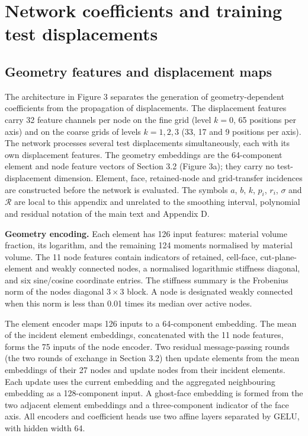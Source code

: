 \documentclass[preprint,12pt,authoryear]{elsarticle}
\begin{document}
\section{Network coefficients and training test displacements}

\subsection{Geometry features and displacement maps}

The architecture in Figure 3 separates the generation of geometry-dependent coefficients from the propagation of displacements. The displacement features carry 32 feature channels per node on the fine grid (level \(k=0\), 65 positions per axis) and on the coarse grids of levels \(k=1,2,3\) (33, 17 and 9 positions per axis). The network processes several test displacements simultaneously, each with its own displacement features. The geometry embeddings are the 64-component element and node feature vectors of Section 3.2 (Figure 3a); they carry no test-displacement dimension. Element, face, retained-node and grid-transfer incidences are constructed before the network is evaluated. The symbols \(a\), \(b\), \(k\), \(p_i\), \(r_i\), \(\sigma\) and \(\mathcal R\) are local to this appendix and unrelated to the smoothing interval, polynomial and residual notation of the main text and Appendix D.

\textbf{Geometry encoding.} Each element has 126 input features: material volume fraction, its logarithm, and the remaining 124 moments normalised by material volume. The 11 node features contain indicators of retained, cell-face, cut-plane-element and weakly connected nodes, a normalised logarithmic stiffness diagonal, and six sine/cosine coordinate entries. The stiffness summary is the Frobenius norm of the node\textquotesingle s diagonal \(3\times3\) block. A node is designated weakly connected when this norm is less than 0.01 times its median over active nodes.

The element encoder maps 126 inputs to a 64-component embedding. The mean of the incident element embeddings, concatenated with the 11 node features, forms the 75 inputs of the node encoder. Two residual message-passing rounds (the two rounds of exchange in Section 3.2) then update elements from the mean embeddings of their 27 nodes and update nodes from their incident elements. Each update uses the current embedding and the aggregated neighbouring embedding as a 128-component input. A ghost-face embedding is formed from the two adjacent element embeddings and a three-component indicator of the face axis. All encoders and coefficient heads use two affine layers separated by GELU, with hidden width 64.
\end{document}
